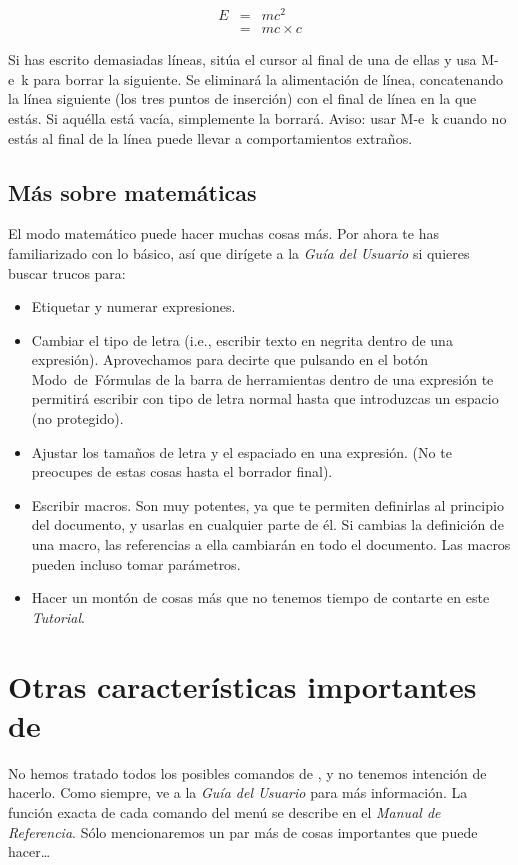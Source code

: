 \begin{eqnarray*}
E & = & mc^{2}\\
 & = & mc\times c\end{eqnarray*}


Si has escrito demasiadas líneas, sitúa el cursor al final de una
de ellas y usa \textsf{M-e~k} para borrar la siguiente. Se eliminará
la alimentación de línea, concatenando la línea siguiente (los tres
puntos de inserción) con el final de línea en la que estás. Si aquélla
está vacía, simplemente la borrará. Aviso: usar \textsf{M-e~k} cuando
no estás al final de la línea puede llevar a comportamientos extraños.


\subsection{Más sobre matemáticas}

El modo matemático puede hacer muchas cosas más. Por ahora te has
familiarizado con lo básico, así que dirígete a la \emph{Guía del
Usuario} si quieres buscar trucos para:

\begin{itemize}
\item Etiquetar y numerar expresiones.
\item Cambiar el tipo de letra (i.e., escribir texto en negrita dentro de
una expresión). Aprovechamos para decirte que pulsando en el botón
\textsf{Modo~de~Fórmulas} de la barra de herramientas dentro de
una expresión te permitirá escribir con tipo de letra normal hasta
que introduzcas un espacio (no protegido).
\item Ajustar los tamaños de letra y el espaciado en una expresión. (No
te preocupes de estas cosas hasta el borrador final).
\item Escribir macros. Son muy potentes, ya que te permiten definirlas al
principio del documento, y usarlas en cualquier parte de él. Si cambias
la definición de una macro, las referencias a ella cambiarán en todo
el documento. Las macros pueden incluso tomar parámetros.
\item Hacer un montón de cosas más que no tenemos tiempo de contarte en
este \emph{Tutorial}.
\end{itemize}


\section{Otras características importantes de \LyX{}}

No hemos tratado todos los posibles comandos de \LyX{}, y no tenemos
intención de hacerlo. Como siempre, ve a la \emph{Guía del Usuario}
para más información. La función exacta de cada comando del menú se
describe en el \emph{Manual de Referencia}. Sólo mencionaremos un
par más de cosas importantes que \LyX{} puede hacer\ldots{}

